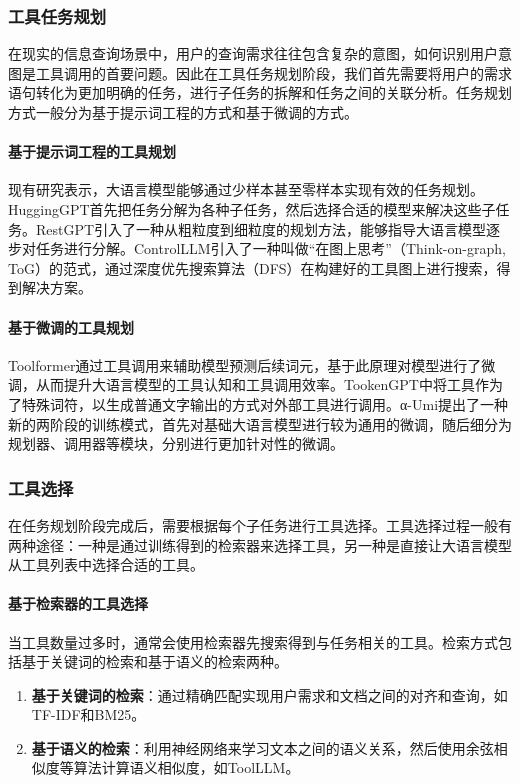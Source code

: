 \subsubsection{工具任务规划}
在现实的信息查询场景中，用户的查询需求往往包含复杂的意图，如何识别用户意图是工具调用的首要问题。因此在工具任务规划阶段，我们首先需要将用户的需求语句转化为更加明确的任务，进行子任务的拆解和任务之间的关联分析。任务规划方式一般分为基于提示词工程的方式和基于微调的方式。

\paragraph{基于提示词工程的工具规划} 
现有研究\cite{Miao2023}表示，大语言模型能够通过少样本甚至零样本实现有效的任务规划。HuggingGPT\cite{Shen2023}首先把任务分解为各种子任务，然后选择合适的模型来解决这些子任务。RestGPT\cite{Song2023}引入了一种从粗粒度到细粒度的规划方法，能够指导大语言模型逐步对任务进行分解。ControlLLM\cite{Liu2023a}引入了一种叫做“在图上思考”（Think-on-graph, ToG）的范式，通过深度优先搜索算法（DFS）在构建好的工具图上进行搜索，得到解决方案。

\paragraph{基于微调的工具规划} 

Toolformer通过工具调用来辅助模型预测后续词元，基于此原理对模型进行了微调，从而提升大语言模型的工具认知和工具调用效率。TookenGPT中将工具作为了特殊词符，以生成普通文字输出的方式对外部工具进行调用。α-Umi提出了一种新的两阶段的训练模式，首先对基础大语言模型进行较为通用的微调，随后细分为规划器、调用器等模块，分别进行更加针对性的微调。

\subsubsection{工具选择}
在任务规划阶段完成后，需要根据每个子任务进行工具选择。工具选择过程一般有两种途径：一种是通过训练得到的检索器来选择工具，另一种是直接让大语言模型从工具列表中选择合适的工具。

\paragraph{基于检索器的工具选择} 
当工具数量过多时，通常会使用检索器先搜索得到与任务相关的工具。检索方式包括基于关键词的检索和基于语义的检索两种。

\begin{enumerate}
    \item \textbf{基于关键词的检索}：通过精确匹配实现用户需求和文档之间的对齐和查询，如TF-IDF\cite{Jones1972}和BM25\cite{Robertson2009}。
    \item \textbf{基于语义的检索}：利用神经网络来学习文本之间的语义关系，然后使用余弦相似度等算法计算语义相似度，如ToolLLM\cite{Qin2023}。
\end{enumerate}

